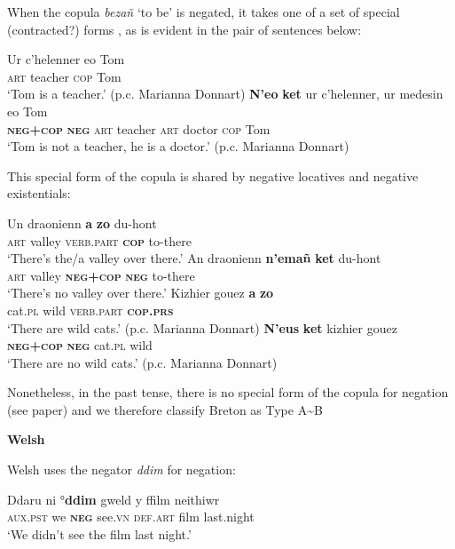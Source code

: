 ﻿\documentclass[output=paper]{langsci/langscibook}
\begin{document}
\begin{unindented}
When the copula \textit{bezañ} `to be' \citep[144]{Press1986} is negated, it takes one of a set of special (contracted?) forms \citep[152]{Press1986}, as is evident in the pair of sentences below:
%
\begin{exe}\ex \gll Ur   c’helenner eo    Tom \\
\textsc{art} teacher \textsc{cop} Tom \\
    \glt `Tom is a teacher.' (p.c. Marianna Donnart)
\ex \gll \textbf{N’eo} \textbf{ket} ur c’helenner, ur medesin eo Tom \\
\textbf{\textsc{neg+cop}} \textbf{\textsc{neg}} \textsc{art} teacher        \textsc{art} doctor    \textsc{cop} Tom \\
    \glt `Tom is not a teacher, he is a doctor.' (p.c. Marianna Donnart)
    \end{exe}

This special form of the copula is shared by negative locatives and negative existentials:
%
\begin{exe}\ex \gll Un  draonienn \textbf{a} \textbf{zo}   du-hont \\
\textsc{art} valley \textsc{verb.part} \textbf{\textsc{cop}} to-there \\
    \glt `There's the/a valley over there.' \citep[154]{Press1986}
\ex \gll
An   draonienn \textbf{n’emañ}     \textbf{ket}  du-hont \\
\textsc{art} valley \textbf{\textsc{neg+cop}} \textbf{\textsc{neg}} to-there \\
    \glt `There's no valley over there.' \citep[155]{Press1986}
\ex \gll Kizhier gouez \textbf{a} \textbf{zo} \\
cat.\textsc{pl}   wild   \textsc{verb.part} \textbf{\textsc{cop.prs}} \\
    \glt `There are wild cats.' (p.c. Marianna Donnart)
\ex \gll \textbf{N’eus} \textbf{ket}   kizhier gouez \\
\textbf{\textsc{neg+cop}} \textbf{\textsc{neg}} cat.\textsc{pl} wild \\
    \glt `There are no wild cats.' (p.c. Marianna Donnart)
    \end{exe}

Nonetheless, in the past tense, there is no special form of the copula for negation (see paper) and we therefore classify Breton as Type A{\textasciitilde}B

\textbf{Welsh}

Welsh uses the negator \textit{ddim} for negation:
%
\begin{exe}\ex \gll Ddaru ni °\textbf{ddim} gweld y ffilm neithiwr \\
\textsc{aux.pst} we \textbf{\textsc{neg}} see.\textsc{vn} \textsc{def.art} film   last.night \\
    \glt `We didn't see the film last night.' \citep[190]{King2003}
    \end{exe}


\end{unindented}
\end{document}

